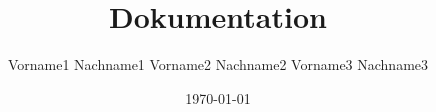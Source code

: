 
\author{Vorname1 Nachname1 Vorname2 Nachname2 Vorname3 Nachname3}
\date{\today}
\title{Dokumentation}


\parindent 0pt
\normalsize

\onehalfspacing
{}
\tableofcontents
\newpage
\pagestyle{scrheadings}
\clearscrheadfoot
\ihead[]{\bfseries\headmark}

\ofoot[]{\pagemark}
\setheadsepline[\textwidth]{1pt}
\setfootsepline[\textwidth]{1pt}
















\listoffigures





